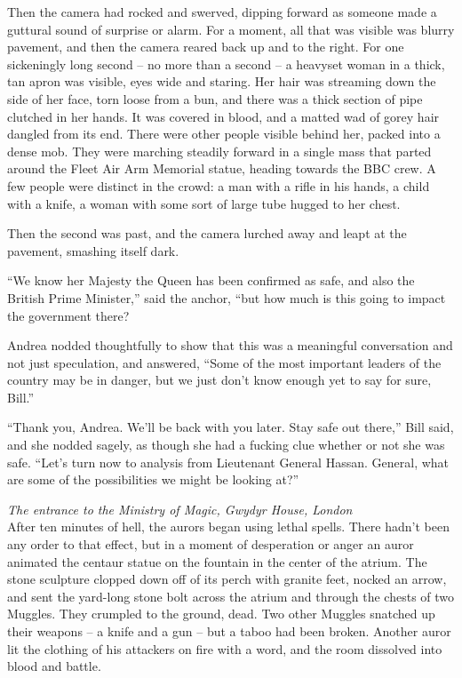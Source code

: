 Then the camera had rocked and swerved, dipping forward as someone made
a guttural sound of surprise or alarm. For a moment, all that was
visible was blurry pavement, and then the camera reared back up and to
the right. For one sickeningly long second -- no more than a second -- a
heavyset woman in a thick, tan apron was visible, eyes wide and staring.
Her hair was streaming down the side of her face, torn loose from a bun,
and there was a thick section of pipe clutched in her hands. It was
covered in blood, and a matted wad of gorey hair dangled from its end.
There were other people visible behind her, packed into a dense mob.
They were marching steadily forward in a single mass that parted around
the Fleet Air Arm Memorial statue, heading towards the BBC crew. A few
people were distinct in the crowd: a man with a rifle in his hands, a
child with a knife, a woman with some sort of large tube hugged to her
chest.

Then the second was past, and the camera lurched away and leapt at the
pavement, smashing itself dark.

``We know her Majesty the Queen has been confirmed as safe, and also the
British Prime Minister,'' said the anchor, ``but how much is this going
to impact the government there?

Andrea nodded thoughtfully to show that this was a meaningful
conversation and not just speculation, and answered, ``Some of the most
important leaders of the country may be in danger, but we just don't
know enough yet to say for sure, Bill.''

``Thank you, Andrea. We'll be back with you later. Stay safe out
there,'' Bill said, and she nodded sagely, as though she had a fucking
clue whether or not she was safe. ``Let's turn now to analysis from
Lieutenant General Hassan. General, what are some of the possibilities
we might be looking at?''

\mybreak

\emph{The entrance to the Ministry of Magic, Gwydyr House, London}\\

After ten minutes of hell, the aurors began using lethal spells. There
hadn't been any order to that effect, but in a moment of desperation or
anger an auror animated the centaur statue on the fountain in the center
of the atrium. The stone sculpture clopped down off of its perch with
granite feet, nocked an arrow, and sent the yard-long stone bolt across
the atrium and through the chests of two Muggles. They crumpled to the
ground, dead. Two other Muggles snatched up their weapons -- a knife and
a gun -- but a taboo had been broken. Another auror lit the clothing of
his attackers on fire with a word, and the room dissolved into blood and
battle.

